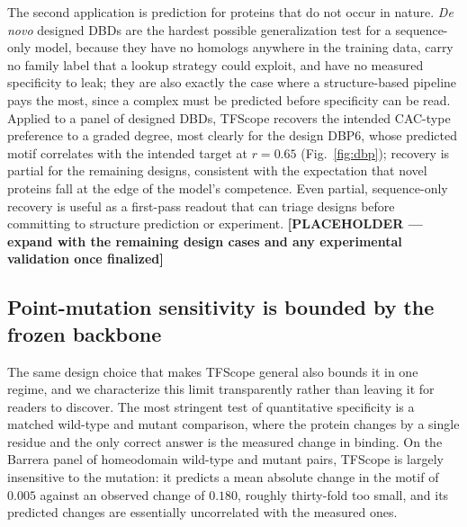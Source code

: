 \documentclass[11pt]{article}
\newcommand{\PLACEHOLDER}[1]{{\color{orange}\textbf{[PLACEHOLDER --- #1]}}}
\begin{document}
The second application is prediction for proteins that do not occur in nature. \emph{De
novo} designed DBDs are the hardest possible generalization test for a sequence-only
model, because they have no homologs anywhere in the training data, carry no family
label that a lookup strategy could exploit, and have no measured specificity to leak;
they are also exactly the case where a structure-based pipeline pays the most, since a
complex must be predicted before specificity can be read. Applied to a panel of
designed DBDs, TFScope recovers the intended CAC-type preference to a graded degree,
most clearly for the design DBP6, whose predicted motif correlates with the intended
target at $r=0.65$ (Fig.~\ref{fig:dbp}); recovery is partial for the remaining designs,
consistent with the expectation that novel proteins fall at the edge of the model's
competence. Even partial, sequence-only recovery is useful as a first-pass readout
that can triage designs before committing to structure prediction or experiment.
\PLACEHOLDER{expand with the remaining design cases and any experimental validation
once finalized}

\subsection*{Point-mutation sensitivity is bounded by the frozen backbone}

The same design choice that makes TFScope general also bounds it in one regime, and we
characterize this limit transparently rather than leaving it for readers to discover.
The most stringent test of quantitative specificity is a matched wild-type and mutant
comparison, where the protein changes by a single residue and the only correct answer
is the measured change in binding. On the Barrera panel of homeodomain wild-type and
mutant pairs\cite{barrera2016survey}, TFScope is largely insensitive to the mutation:
it predicts a mean absolute change in the motif of $0.005$ against an observed change
of $0.180$, roughly thirty-fold too small, and its predicted changes are essentially
uncorrelated with the measured ones.
\end{document}
